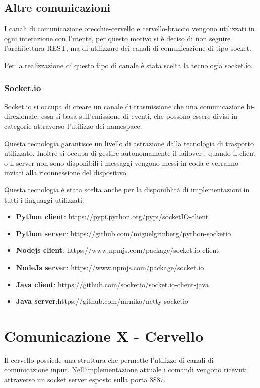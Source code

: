 \documentclass[twoside]{supsistudent}
\begin{document}
\section{Altre comunicazioni}
I canali di comunicazione orecchie-cervello e cervello-braccio vengono utilizzati in ogni interazione con l'utente, per questo motivo si è deciso di non seguire l'architettura REST, ma di utilizzare dei canali di comunicazione di tipo socket.

Per la realizzazione di questo tipo di canale è stata scelta la tecnologia socket.io. 
\subsection{Socket.io}
Socket.io si occupa di creare un canale di trasmissione che una comunicazione bi-direzionale; essa si basa sull'emissione di eventi, che possono essere divisi in categorie attraverso l'utilizzo dei namespace.

Questa tecnologia garantisce un livello di astrazione dalla tecnologia di trasporto utilizzato. Inoltre si occupa di gestire autonomamente il failover : quando il client o il server non sono disponibili i messaggi vengono messi in coda e verranno inviati alla riconnessione del dispositivo.

Questa tecnologia è stata scelta anche per la disponiblità di implementazioni in tutti i linguaggi utilizzati:
\begin{itemize}
	\item \textbf{Python client}: https://pypi.python.org/pypi/socketIO-client
	\item \textbf{Python server}: https://github.com/miguelgrinberg/python-socketio
	\item \textbf{Nodejs client}: https://www.npmjs.com/package/socket.io-client
	\item \textbf{NodeJs server}: https://www.npmjs.com/package/socket.io
	\item \textbf{Java client}: https://github.com/socketio/socket.io-client-java
	\item \textbf{Java server}:https://github.com/mrniko/netty-socketio
\end{itemize}

\chapter{Comunicazione X - Cervello }
Il cervello possiede una struttura che permette l'utilizzo di canali di comunicazione input. Nell'implementazione attuale i comandi vengono ricevuti attraverso un socket server esposto sulla porta 8887.
\end{document}
